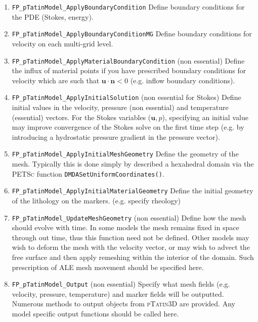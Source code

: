 \documentclass[paper=a4, fontsize=10pt,twoside]{scrartcl}
\newcommand{\ptat}{{{\textsc{pTatin3D}}}}
\newcommand{\PETSc}{{{\textsc{PETSc}}}}
\newcommand{\unix}[1]{\texttt{\footnotesize #1}}
\begin{document}
{{\begin{enumerate}
	\item \unix{FP\_pTatinModel\_ApplyBoundaryCondition}
	Define boundary conditions for the PDE (Stokes, energy).

	\item \unix{FP\_pTatinModel\_ApplyBoundaryConditionMG}
	Define boundary conditions for velocity on each multi-grid level.

	\item \unix{FP\_pTatinModel\_ApplyMaterialBoundaryCondition} (non essential)
	Define the influx of material points if you have prescribed boundary conditions for velocity which are such that $\boldsymbol u \cdot \boldsymbol n < 0$ (e.g. inflow boundary conditions).

	\item \unix{FP\_pTatinModel\_ApplyInitialSolution} (non essential for Stokes)
	Define initial values in the velocity, pressure (non essential) and temperature (essential) vectors. For the Stokes variables ($\boldsymbol u,p$), specifying an initial value may improve convergence of the Stokes solve on the first time step (e.g. by introducing a hydrostatic pressure gradient in the pressure vector).

	\item \unix{FP\_pTatinModel\_ApplyInitialMeshGeometry}
	Define the geometry of the mesh. Typically this is done simply by described a hexahedral domain via the {\PETSc} function \unix{DMDASetUniformCoordinates()}.

	\item \unix{FP\_pTatinModel\_ApplyInitialMaterialGeometry}
	Define the initial geometry of the lithology on the markers. (e.g. specify rheology)

	\item \unix{FP\_pTatinModel\_UpdateMeshGeometry} (non essential)
	Define how the mesh should evolve with time. In some models the mesh remains fixed in space through out time, thus this function need not be defined. Other models may wish to deform the mesh with the velocity vector, or may wish to advect the free surface and then apply remeshing within the interior of the domain. Such prescription of ALE mesh movement should be specified here.

	\item \unix{FP\_pTatinModel\_Output} (non essential)
	Specify what mesh fields (e.g. velocity, pressure, temperature) and marker fields will be outputted. Numerous
	methods to output objects from {\ptat} are provided. Any model specific output functions should be called here.


\end{enumerate}}}
\end{document}
